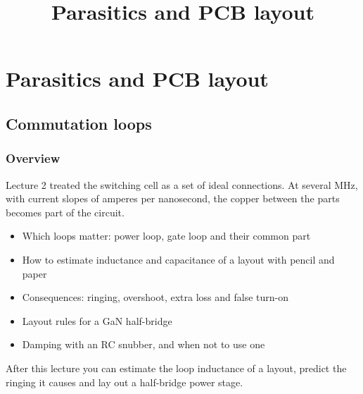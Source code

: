 \title[Parasitics and PCB layout]{Parasitics and PCB layout}
\section{Parasitics and PCB layout}

\begin{frame}[plain]
	\titlepage
\end{frame}

\subsection{Commutation loops}

\begin{frame}
	\frametitle{Overview}
	Lecture 2 treated the switching cell as a set of ideal connections. At several MHz, with current slopes of amperes per nanosecond, the copper between the parts becomes part of the circuit.
	\begin{itemize}
		\item Which loops matter: power loop, gate loop and their common part
		\item How to estimate inductance and capacitance of a layout with pencil and paper
		\item Consequences: ringing, overshoot, extra loss and false turn-on
		\item Layout rules for a GaN half-bridge
		\item Damping with an RC snubber, and when not to use one
	\end{itemize}
	After this lecture you can estimate the loop inductance of a layout, predict the ringing it causes and lay out a half-bridge power stage.
\end{frame}

